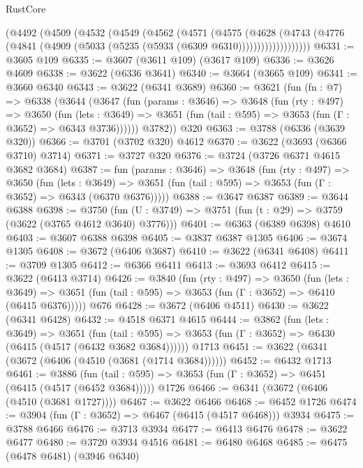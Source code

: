 \begin{lexlean}{RustCore}
\begin{coremodule}
          (@4492
            (@4509
              (@4532
                (@4549
                  (@4562
                    (@4571
                      (@4575
                        (@4628
                          (@4743
                            (@4776
                              (@4841 (@4909 (@5033 (@5235 (@5933 (@6309 @6310)))))))))))))))))))
@6331 := @3605 @109
@6335 := @3607 (@3611 @109) (@3617 @109)
@6336 := @3626 @4609
@6338 := @3622 (@6336 @3641)
@6340 := @3664 (@3665 @109)
@6341 := @3660 @6340
@6343 := @3622 (@6341 @3689)
@6360 := @3621
    (fun (fn : @7) =>
    @6338
      (@3644
        (@3647
          (fun (params : @3646) =>
          @3648
            (fun (rty : @497) =>
            @3650
              (fun (lets : @3649) =>
              @3651 (fun (tail : @595) => @3653 (fun (Γ : @3652) => @6343 @3736))))))
        @3782))
    @320
@6363 := @3788 (@6336 (@3639 @320))
@6366 := @3701 (@3702 @320) @4612
@6370 := @3622 (@3693 (@6366 @3710) @3714)
@6371 := @3727 @320
@6376 := @3724 (@3726 @6371 @4615 @3682 @3684)
@6387 := fun (params : @3646) =>
  @3648
    (fun (rty : @497) =>
    @3650
      (fun (lets : @3649) =>
      @3651 (fun (tail : @595) => @3653 (fun (Γ : @3652) => @6343 (@6370 @6376)))))
@6388 := @3647 @6387
@6389 := @3644 @6388
@6398 := @3750 (fun (U : @3749) => @3751 (fun (t : @29) => @3759 (@3622 (@3765 @4612 @3640) @3776)))
@6401 := @6363 (@6389 @6398) @4610
@6403 := @3607 @6388 @6398
@6405 := @3837 @6387 @1305
@6406 := @3674 @1305
@6408 := @3672 (@6406 @3687)
@6410 := @3622 (@6341 @6408)
@6411 := @3709 @1305
@6412 := @6366 @6411
@6413 := @3693 @6412
@6415 := @3622 (@6413 @3714)
@6426 := @3840
    (fun (rty : @497) =>
    @3650
      (fun (lets : @3649) =>
      @3651 (fun (tail : @595) => @3653 (fun (Γ : @3652) => @6410 (@6415 @6376)))))
    @676
@6428 := @3672 (@6406 @4511)
@6430 := @3622 (@6341 @6428)
@6432 := @4518 @6371 @4615
@6444 := @3862
    (fun (lets : @3649) =>
    @3651
      (fun (tail : @595) => @3653 (fun (Γ : @3652) => @6430 (@6415 (@4517 (@6432 @3682 @3684))))))
    @1713
@6451 := @3622 (@6341 (@3672 (@6406 (@4510 (@3681 (@1714 @3684))))))
@6452 := @6432 @1713
@6461 := @3886
    (fun (tail : @595) => @3653 (fun (Γ : @3652) => @6451 (@6415 (@4517 (@6452 @3684)))))
    @1726
@6466 := @6341 (@3672 (@6406 (@4510 (@3681 @1727))))
@6467 := @3622 @6466
@6468 := @6452 @1726
@6474 := @3904 (fun (Γ : @3652) => @6467 (@6415 (@4517 @6468))) @3934
@6475 := @3788 @6466
@6476 := @3713 @3934
@6477 := @6413 @6476
@6478 := @3622 @6477
@6480 := @3720 @3934 @4516
@6481 := @6480 @6468
@6485 := @6475 (@6478 @6481) (@3946 @6340)

\end{coremodule}
\end{lexlean}
